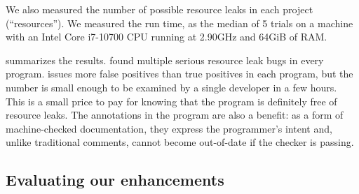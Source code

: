 We also measured the number of
possible resource leaks in each project (``resources'').
We measured the run time,
as the median of 5 trials on
a machine with an Intel Core i7-10700 CPU running at 2.90GHz and 64GiB of RAM\@.


 summarizes the results. \Tool found multiple
serious resource leak bugs in every program. \Tool issues
more false positives than true positives in each program, but
the number is small enough to be examined by a single developer in a
few hours.  This is a small price to pay for knowing that the program is
definitely free of resource leaks.  The annotations in the program are
also a benefit: as a form of machine-checked documentation, they
express the programmer's intent and, unlike traditional comments,
cannot become out-of-date if the checker is passing.




\subsection{Evaluating our enhancements}
\label{sec:ablation}

\newcommand{\abltablerow}[4]{\textbf{\smaller{#1}} & #2 & #3 & #4}

